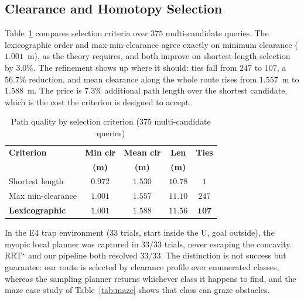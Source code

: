 \documentclass[conference]{IEEEtran}
\begin{document}
\subsection{Clearance and Homotopy Selection}
\label{sec:res-selection}
Table~\ref{tab:clearance} compares selection criteria over $375$ multi-candidate queries. The lexicographic order and max-min-clearance agree exactly on minimum clearance ($1.001$~m), as the theory requires, and both improve on shortest-length selection by $3.0\%$. The refinement shows up where it should: ties fall from $247$ to $107$, a $56.7\%$ reduction, and mean clearance along the whole route rises from $1.557$~m to $1.588$~m. The price is $7.3\%$ additional path length over the shortest candidate, which is the cost the criterion is designed to accept.
\begin{table}[htbp]
\caption{Path quality by selection criterion (375 multi-candidate queries)}
\label{tab:clearance}
\begin{center}
\begin{tabular}{@{}lcccc@{}}
\toprule
\textbf{Criterion} & \textbf{Min clr} & \textbf{Mean clr} & \textbf{Len} & \textbf{Ties} \\
 & \textbf{(m)} & \textbf{(m)} & \textbf{(m)} & \\ \midrule
Shortest length & $0.972$ & $1.530$ & $\mathbf{10.78}$ & $1$ \\
Max min-clearance & $\mathbf{1.001}$ & $1.557$ & $11.10$ & $247$ \\
\textbf{Lexicographic} & $\mathbf{1.001}$ & $\mathbf{1.588}$ & $11.56$ & $\mathbf{107}$ \\ \bottomrule
\end{tabular}
\end{center}
\end{table}
In the E4 trap environment ($33$ trials, start inside the U, goal outside), the myopic local planner was captured in $33/33$ trials, never escaping the concavity. RRT$^\star$ and our pipeline both resolved $33/33$. The distinction is not success but guarantee: our route is selected by clearance profile over enumerated classes, whereas the sampling planner returns whichever class it happens to find, and the maze case study of Table~\ref{tab:maze} shows that class can graze obstacles.
\end{document}
